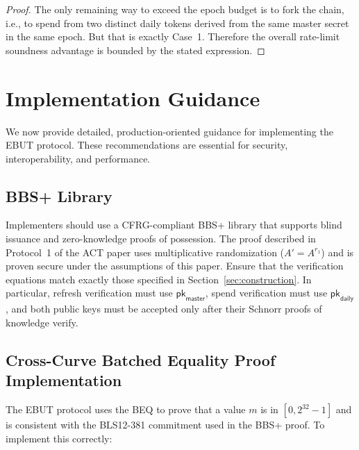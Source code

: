 \documentclass[11pt]{article}
\theoremstyle{definitionstyle}
\theoremstyle{plain}
\begin{document}
\begin{proof}
The only remaining way to exceed the epoch budget is to fork the chain, i.e., to spend from two distinct daily tokens derived from the same master secret in the same epoch. But that is exactly Case~1. Therefore the overall rate-limit soundness advantage is bounded by the stated expression.
\end{proof}

\section{Implementation Guidance}

We now provide detailed, production-oriented guidance for implementing the EBUT protocol. These recommendations are essential for security, interoperability, and performance.

\subsection{BBS+ Library}

Implementers should use a CFRG-compliant BBS+ library that supports blind issuance and zero-knowledge proofs of possession. The proof described in Protocol~1 of the ACT paper uses multiplicative randomization ($A' = A^{r_1}$) and is proven secure under the assumptions of this paper. Ensure that the verification equations match exactly those specified in Section~\ref{sec:construction}. In particular, refresh verification must use $\mathsf{pk}_{\mathsf{master}}$, spend verification must use $\mathsf{pk}_{\mathsf{daily}}$, and both public keys must be accepted only after their Schnorr proofs of knowledge verify.

\subsection{Cross-Curve Batched Equality Proof Implementation}

The EBUT protocol uses the BEQ to prove that a value $m$ is in $[0,2^{32}-1]$ and is consistent with the BLS12-381 commitment used in the BBS+ proof. To implement this correctly:
\end{document}
